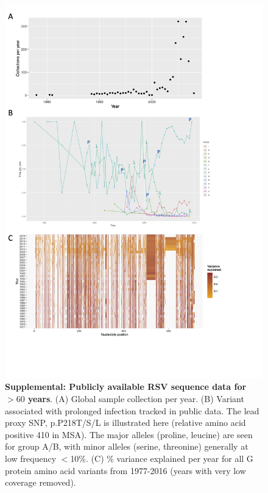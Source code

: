 \documentclass{article} %
\begin{document}
\begin{figure}[ht] \hspace{-0.5cm} \begin{center}
    \includegraphics[scale=0.15]{S2}
	\caption{\textbf{Supplemental: Publicly available RSV sequence data for $>60$ years}. (A) Global sample collection per year. (B) Variant associated with prolonged infection tracked in public data. The lead proxy SNP, p.P218T/S/L is illustrated here (relative amino acid positive 410 in MSA). The major alleles (proline, leucine) are seen for group A/B, with minor alleles (serine, threonine) generally at low frequency $<$10\%.
	(C) \% variance explained per year for all G protein amino acid variants from 1977-2016 (years with very low coverage removed).}
	\label{fig:S2} \end{center}
\end{figure}
\end{document}

